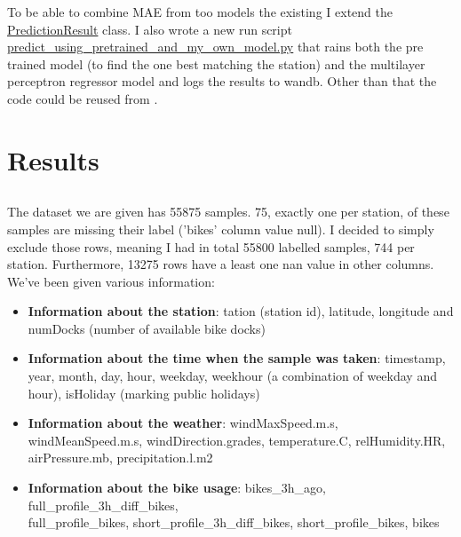 \documentclass[a4paper]{article}
\begin{document}
    To be able to combine MAE from too models the existing I extend the \href{https://github.com/isabelladegen/mlp-2021/blob/fba40c1f27f066e1c5413c45a50c90a32a018f81/src/PredictionResult.py}{PredictionResult}
    class. I also wrote a new run script \href{https://github.com/isabelladegen/mlp-2021/blob/fba40c1f27f066e1c5413c45a50c90a32a018f81/src/predict_using_pretrained_and_my_own_model.py}{predict\_using\_pretrained\_and\_my\_own\_model.py}
    that rains both the pre trained model (to find the one best matching the station) and the multilayer perceptron regressor model
    and logs the results to wandb. Other than that the code could be reused from .




    \section{Results}\label{sec:results}
    \subsection*{}
    \subsubsection*{}
    The dataset we are given has 55875 samples. 75, exactly one per station, of these samples are missing their label ('bikes'
    column value null).
    I decided to simply exclude those rows, meaning I had in total 55800 labelled samples, 744 per station. Furthermore,
    13275 rows have a least one nan value in other columns.
    We've been given various information:
    \begin{itemize}
        \item \textbf{Information about the station}: tation (station id), latitude, longitude and
        numDocks (number of available bike docks)
        \item \textbf{Information about the time when the sample was taken}: timestamp, year, month, day, hour,
        weekday, weekhour (a combination of weekday and hour), isHoliday (marking public holidays)
        \item \textbf{Information about the weather}: windMaxSpeed.m.s, windMeanSpeed.m.s,  windDirection.grades,
        temperature.C, relHumidity.HR, airPressure.mb, precipitation.l.m2
        \item \textbf{Information about the bike usage}: bikes\_3h\_ago,
        full\_profile\_3h\_diff\_bikes,\\
        full\_profile\_bikes, short\_profile\_3h\_diff\_bikes,
        short\_profile\_bikes, bikes
    \end{itemize}
\end{document}
